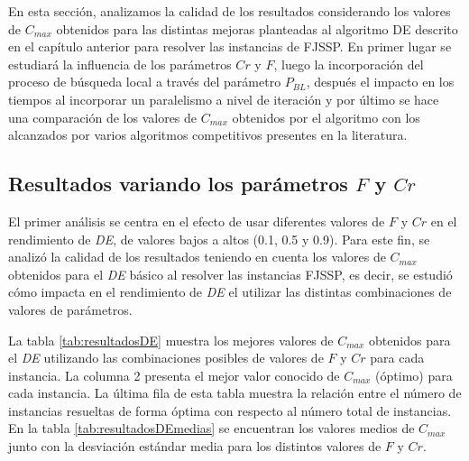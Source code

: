 En esta sección, analizamos la calidad de los resultados considerando los valores de $ C_ {max} $ obtenidos para las distintas mejoras planteadas al algoritmo DE descrito en el capítulo anterior para resolver las instancias de FJSSP.
En primer lugar se estudiará la influencia de los parámetros $Cr$ y $F$, luego la incorporación del proceso de búsqueda local a través del parámetro $P_{BL}$, después el impacto en los tiempos al incorporar un paralelismo a nivel de iteración y por último se hace una comparación de los valores de $ C_ {max} $ obtenidos por el algoritmo con los alcanzados por varios algoritmos competitivos presentes en la literatura. 


\subsection{Resultados variando los parámetros $F$ y $Cr$ }

El primer análisis se centra en el efecto de usar diferentes valores de $F$ y $Cr$ en el rendimiento de \textit{DE}, de valores bajos a altos (0.1, 0.5 y 0.9). Para este fin, se analizó la calidad de los resultados teniendo en cuenta los valores de $C_{max}$ obtenidos para el \textit{DE} básico al resolver las instancias FJSSP, es decir, se estudió cómo impacta en el rendimiento de \textit{DE} el utilizar las distintas combinaciones de valores de parámetros.


La tabla \ref{tab:resultadosDE} muestra los mejores valores de $C_{max}$ obtenidos para el \textit{DE} utilizando las combinaciones posibles de valores de $F$ y $Cr$ para cada instancia. La columna 2 presenta el mejor valor conocido de $C_{max}$ (óptimo) para cada instancia. La última fila de esta tabla muestra la relación entre el número de instancias resueltas de forma óptima con respecto al número total de instancias. En la tabla \ref{tab:resultadosDEmedias} se encuentran los valores medios de $C_{max}$ junto con la desviación estándar media para los distintos valores de $F$ y $Cr$. 


